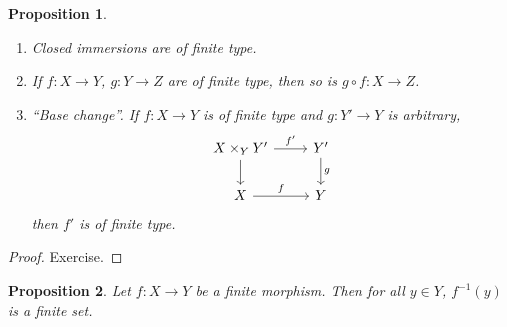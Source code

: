 \documentclass[12pt]{article}
\newtheorem*{proposition}{Proposition}
\theoremstyle{definition}
\begin{document}
\begin{proposition}
\begin{enumerate}[label=\arabic*)]
\item Closed immersions are of finite type.

\item If $f:X\rightarrow Y$, $g:Y\rightarrow Z$ are of finite type, then so is $g\circ f:X\rightarrow Z$.

\item ``Base change''. If $f:X\rightarrow Y$ is of finite type and $g:Y'\rightarrow Y$ is arbitrary,
\[
\begin{tikzcd}
X\times_YY'\arrow[r,"f'"]\arrow[d]&Y'\arrow[d,"g"]\\
X\arrow[r,"f"]&Y
\end{tikzcd}
\]
then $f'$ is of finite type.
\end{enumerate}
\end{proposition}

\begin{proof}
Exercise.
\end{proof}

\begin{proposition}
Let $f:X\rightarrow Y$ be a finite morphism. Then for all $y\in Y$, $f^{-1}(y)$ is a finite set.
\end{proposition}
\end{document}
